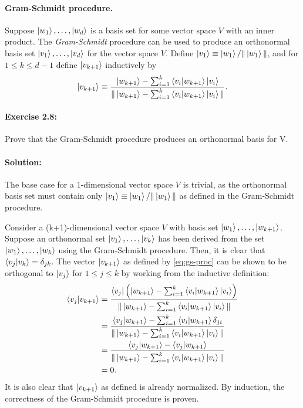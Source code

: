 \paragraph{Gram-Schmidt procedure.} Suppose $\ket{w_1}, \ldots, \ket{w_d}$ is a
basis set for some vector space $V$ with an inner product. The
\emph{Gram-Schmidt} procedure can be used to produce an orthonormal basis set
$\ket{v_1}, \ldots, \ket{v_d}$ for the vector space $V$. Define $\ket{v_1}
\equiv \ket{w_1}/\|\ket{w_1}\|$, and for $1 \leq k \leq d - 1$ define
$\ket{v_{k+1}}$ inductively by \begin{equation}
  \ket{v_{k+1}} \equiv \frac{\ket{w_{k+1}} - \sum_{i=1}^k \braket{v_i}{w_{k+1}}
    \ket{v_i}}{\|\ket{w_{k+1}} - \sum_{i=1}^k \braket{v_i}{w_{k+1}}
    \ket{v_i}\|}. \label{eq:gs-proc}
\end{equation}

\paragraph{\cite{mikeandike} Exercise 2.8:} Prove that the Gram-Schmidt
procedure produces an orthonormal basis for V.

\paragraph{Solution:} The base case for a 1-dimensional vector space $V$ is
trivial, as the orthonormal basis set must contain only $\ket{v_1} \equiv
\ket{w_1}/\|\ket{w_1}\|$ as defined in the Gram-Schmidt procedure.

Consider a (k+1)-dimensional vector space $V$ with basis set $\ket{w_1},
\ldots, \ket{w_{k+1}}$. Suppose an orthonormal set $\ket{v_1}, \ldots,
\ket{v_k}$ has been derived from the set $\ket{w_1}, \ldots, \ket{w_k}$ using
the Gram-Schmidt procedure. Then, it is clear that $\braket{v_j}{v_k} =
\delta_{jk}$. The vector $\ket{v_{k+1}}$ as defined by \eqref{eq:gs-proc} can
be shown to be orthogonal to $\ket{v_j}$ for $1 \leq j \leq k$ by working from
the inductive definition: \begin{align*}
  \braket{v_j}{v_{k+1}}
  &= \frac{\bra{v_j} \left(\ket{w_{k+1}} - \sum_{i=1}^k
    \braket{v_i}{w_{k+1}}\ket{v_i}\right)}{\|\ket{w_{k+1}} - \sum_{i=1}^k
    \braket{v_i}{w_{k+1}}\ket{v_i}\|} \\
  &= \frac{\braket{v_j}{w_{k+1}} - \sum_{i=1}^k \braket{v_i}{w_{k+1}}
    \delta_{ji}}{\|\ket{w_{k+1}} - \sum_{i=1}^k \braket{v_i}{w_{k+1}}
    \ket{v_i}\|} \\
  &= \frac{\braket{v_j}{w_{k+1}} - \braket{v_j}{w_{k+1}}}{\|\ket{w_{k+1}} -
    \sum_{i=1}^k \braket{v_i}{w_{k+1}}\ket{v_i}\|} \\
  &= 0.
\end{align*} It is also clear that $\ket{v_{k+1}}$ as defined is already
normalized. By induction, the correctness of the Gram-Schmidt procedure is
proven.

